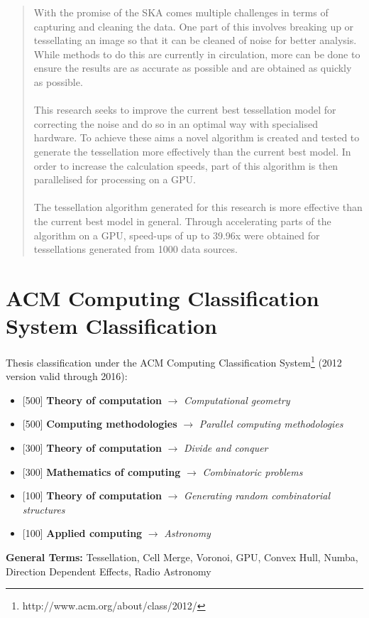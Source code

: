\begin{abstract}
With the promise of the SKA comes multiple challenges in terms of capturing and cleaning the data. One part of this involves breaking up or tessellating an image so that it can be cleaned of noise for better analysis. While methods to do this are currently in circulation, more can be done to ensure the results are as accurate as possible and are obtained as quickly as possible.
\\
\\
This research seeks to improve the current best tessellation model for correcting the noise and do so in an optimal way with specialised hardware. To achieve these aims a novel algorithm is created and tested to generate the tessellation more effectively than the current best model. In order to increase the calculation speeds, part of this algorithm is then parallelised for processing on a GPU.
\\
\\
The tessellation algorithm generated for this research is more effective than the current best model in general. Through accelerating parts of the algorithm on a GPU, speed-ups of up to 39.96x were obtained for tessellations generated from 1000 data sources.
\end{abstract}

\chapter*{ACM Computing Classification System Classification}
Thesis classification under the ACM Computing Classification System\footnote{http://www.acm.org/about/class/2012/} (2012 version valid through 2016):

\begin{itemize}
\item {[500] \textbf{Theory of computation} $\rightarrow$ \em {Computational geometry} }
\item {[500] \textbf{Computing methodologies} $\rightarrow$ \em {Parallel computing methodologies} }
\item {[300] \textbf{Theory of computation} $\rightarrow$ \em {Divide and conquer} }
\item {[300] \textbf{Mathematics of computing} $\rightarrow$ \em {Combinatoric problems} }
\item {[100] \textbf{Theory of computation} $\rightarrow$ \em {Generating random combinatorial structures} }
\item {[100] \textbf{Applied computing} $\rightarrow$ \em {Astronomy} }
\end{itemize}
\textbf{General Terms:} Tessellation, Cell Merge, Voronoi, GPU, Convex Hull, Numba, Direction Dependent Effects, Radio Astronomy

